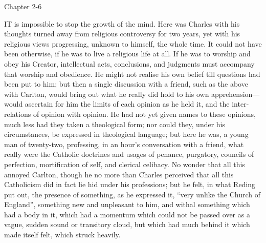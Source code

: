 Chapter 2-6


IT is impossible to stop the growth of
the mind. Here was Charles with his thoughts turned away from
religious controversy for two years, yet with his religious views
progressing, unknown to himself, the whole time. It could not have
been otherwise, if he was to live a religious life at all. If he was
to worship and obey his Creator, intellectual acts, conclusions, and
judgments must accompany that worship and obedience. He might not
realise his own belief till questions had been put to him; but then a
single discussion with a friend, such as the above with Carlton, would
bring out what he really did hold to his own apprehension—would
ascertain for him the limits of each opinion as he held it, and the
inter-relations of opinion with opinion. He had not yet given names to
these opinions, much less had they taken a theological form; nor could
they, under his circumstances, be expressed in theological language;
but here he was, a young man of twenty-two, professing, in an hour's
conversation with a friend, what really were the Catholic doctrines
and usages of penance, purgatory, councils of perfection,
mortification of self, and clerical celibacy. No wonder that all
this annoyed Carlton, though he no more than Charles perceived that
all this Catholicism did in fact lie hid under his professions; but he
felt, in what Reding put out, the presence of something, as he
expressed it, ``very unlike the Church of England'', something
new and unpleasant to him, and withal something which had a body in
it, which had a momentum which could not be passed over as a vague,
sudden sound or transitory cloud, but which had much behind it which
made itself felt, which struck heavily.

